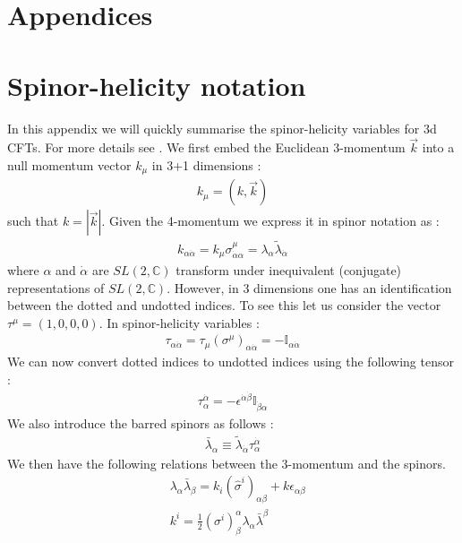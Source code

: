 \documentclass[a4paper,11pt]{article}
\begin{document}
\section*{Appendices}
\appendix
\section{Spinor-helicity notation}\label{shn}
In this appendix we will quickly summarise the spinor-helicity variables for 3d CFTs. For more details see \cite{Mata:2012bx, Farrow:2018yni} . We first embed the Euclidean 3-momentum $\vec k$ into a null momentum vector $k_\mu$ in 3+1 dimensions :
%
\begin{align}
k_\mu=(k,\vec k)
\end{align}
%
such that $k=|\vec k|$. Given the 4-momentum we express it in spinor notation as :
%
\begin{align}
k_{\alpha\dot\alpha}=k_\mu\sigma^\mu_{\dot\alpha\alpha}=\lambda_\alpha\widetilde\lambda_{\dot\alpha}
\end{align}
%
where $\alpha$ and $\dot\alpha$ are $SL(2,\mathbb C)$ transform under inequivalent (conjugate) representations of $SL(2,\mathbb C)$. However, in 3 dimensions one has an identification between the dotted and undotted indices. To see this let us consider the vector $\tau^\mu=(1,0,0,0)$. In spinor-helicity variables :
%
\begin{align}
\tau_{\alpha\dot\alpha}=\tau_\mu(\sigma^{\mu})_{\alpha\dot\alpha}=-\mathbb I_{\alpha\dot\alpha}
\end{align}
%
We can now convert dotted indices to undotted indices using the following tensor :
%
\begin{align}
\tau^{\dot\alpha}_{\alpha}=-\epsilon^{\dot\alpha\dot\beta}\mathbb I_{\dot\beta\alpha}
\end{align}
%
We also introduce the barred spinors as follows :
%
\begin{align}
\bar\lambda_\alpha\equiv\widetilde\lambda_{\dot\alpha}\tau^{\dot\alpha}_\alpha
\end{align}
%
We then have the following relations between the 3-momentum and the spinors.
\begin{align}
&\lambda_{\alpha} \bar{\lambda}_{\beta}=k_{i}\left(\hat{\sigma}^{i}\right)_{\alpha \beta}+k \epsilon_{\alpha \beta}\\[5 pt]
&k^{i}=\frac{1}{2}\left(\sigma^{i}\right)_{\beta}^{\alpha} \lambda_{\alpha} \bar{\lambda}^{\beta}
\end{align} 
\end{document}
